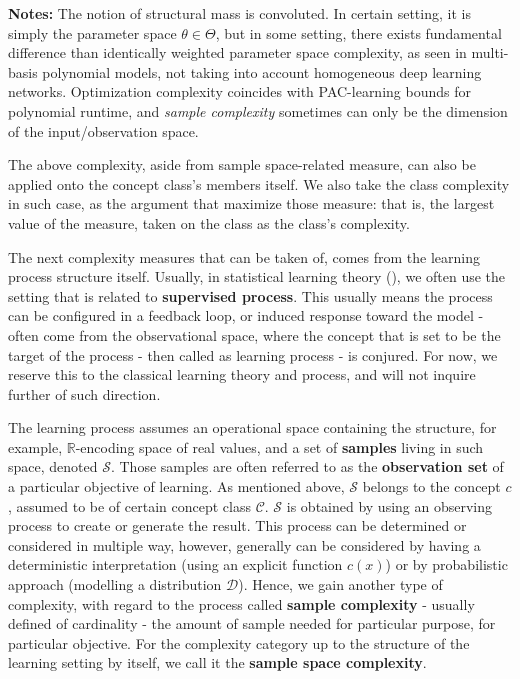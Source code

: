 \begin{table}[htbp]
\begin{threeparttable}
    \begin{tablenotes}
      \footnotesize
      \item[] \textbf{Notes:} The notion of structural mass is convoluted. In certain setting, it is simply the parameter space $\theta\in\Theta$, but in some setting, there exists fundamental difference than identically weighted parameter space complexity, as seen in multi-basis polynomial models, not taking into account homogeneous deep learning networks. Optimization complexity coincides with PAC-learning bounds for polynomial runtime, and \textit{sample complexity} sometimes can only be the dimension of the input/observation space.
    \end{tablenotes}
  \end{threeparttable}
\end{table}

The above complexity, aside from sample space-related measure, can also be applied onto the concept class's members itself. We also take the class complexity in such case, as the argument that maximize those measure: that is, the largest value of the measure, taken on the class as the class's complexity. 

The next complexity measures that can be taken of, comes from the learning process structure itself. Usually, in statistical learning theory (\cite{STL_Hajek_Maxim_2021,10.5555/2371238,10.5555/2621980}), we often use the setting that is related to \textbf{supervised process}. This usually means the process can be configured in a feedback loop, or induced response toward the model - often come from the observational space, where the concept that is set to be the target of the process - then called as learning process - is conjured. For now, we reserve this to the classical learning theory and process, and will not inquire further of such direction. 

The learning process assumes an operational space containing the structure, for example, $\mathbb{R}$-encoding space of real values, and a set of \textbf{samples} living in such space, denoted $\mathcal{S}$. Those samples are often referred to as the \textbf{observation set} of a particular objective of learning. As mentioned above, $\mathcal{S}$ belongs to the concept $c$, assumed to be of certain concept class $\mathcal{C}$. $\mathcal{S}$ is obtained by using an observing process to create or generate the result. This process can be determined or considered in multiple way, however, generally can be considered by having a deterministic interpretation (using an explicit function $c(x)$) or by probabilistic approach (modelling a distribution $\mathcal{D}$). Hence, we gain another type of complexity, with regard to the process called \textbf{sample complexity} - usually defined of cardinality - the amount of sample needed for particular purpose, for particular objective. For the complexity category up to the structure of the learning setting by itself, we call it the \textbf{sample space complexity}. 

